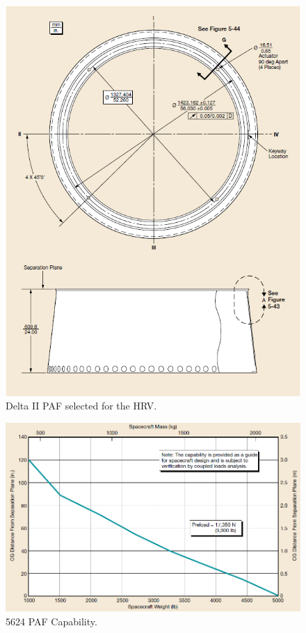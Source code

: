 \documentclass[paper=letter, fontsize=11pt]{scrartcl} %
\numberwithin{equation}{section} %
\numberwithin{figure}{section} %
\numberwithin{table}{section} %
\begin{document}
\begin{figure}[H]
    \begin{center}
        \includegraphics[width=.75\textwidth]{SS13_Shock_PAF/13-5.png}
        \caption{Delta II PAF selected for the HRV.}
        \label{fig:13.5}
    \end{center}
\end{figure}

\begin{figure}[H]
    \begin{center}
        \includegraphics[width=.75\textwidth]{SS13_Shock_PAF/13-6.png}
        \caption{5624 PAF Capability.}
        \label{fig:13.6}
    \end{center}
\end{figure}
\end{document}
